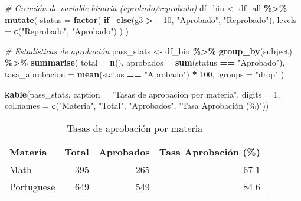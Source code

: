 \documentclass[
]{book}
\newenvironment{Shaded}{\begin{snugshade}}{\end{snugshade}}
\newcommand{\AttributeTok}[1]{\textcolor[rgb]{0.13,0.29,0.53}{#1}}
\newcommand{\CommentTok}[1]{\textcolor[rgb]{0.56,0.35,0.01}{\textit{#1}}}
\newcommand{\DecValTok}[1]{\textcolor[rgb]{0.00,0.00,0.81}{#1}}
\newcommand{\FunctionTok}[1]{\textcolor[rgb]{0.13,0.29,0.53}{\textbf{#1}}}
\newcommand{\NormalTok}[1]{#1}
\newcommand{\OtherTok}[1]{\textcolor[rgb]{0.56,0.35,0.01}{#1}}
\newcommand{\SpecialCharTok}[1]{\textcolor[rgb]{0.81,0.36,0.00}{\textbf{#1}}}
\newcommand{\StringTok}[1]{\textcolor[rgb]{0.31,0.60,0.02}{#1}}
\begin{document}
\begin{Shaded}
\begin{Highlighting}[]
\CommentTok{\# Creación de variable binaria (aprobado/reprobado)}
\NormalTok{df\_bin }\OtherTok{\textless{}{-}}\NormalTok{ df\_all }\SpecialCharTok{\%\textgreater{}\%}
  \FunctionTok{mutate}\NormalTok{(}
    \AttributeTok{status =} \FunctionTok{factor}\NormalTok{(}
      \FunctionTok{if\_else}\NormalTok{(g3 }\SpecialCharTok{\textgreater{}=} \DecValTok{10}\NormalTok{, }\StringTok{"Aprobado"}\NormalTok{, }\StringTok{"Reprobado"}\NormalTok{),}
      \AttributeTok{levels =} \FunctionTok{c}\NormalTok{(}\StringTok{"Reprobado"}\NormalTok{, }\StringTok{"Aprobado"}\NormalTok{)}
\NormalTok{    )}
\NormalTok{  )}

\CommentTok{\# Estadísticas de aprobación}
\NormalTok{pass\_stats }\OtherTok{\textless{}{-}}\NormalTok{ df\_bin }\SpecialCharTok{\%\textgreater{}\%}
  \FunctionTok{group\_by}\NormalTok{(subject) }\SpecialCharTok{\%\textgreater{}\%}
  \FunctionTok{summarise}\NormalTok{(}
    \AttributeTok{total =} \FunctionTok{n}\NormalTok{(),}
    \AttributeTok{aprobados =} \FunctionTok{sum}\NormalTok{(status }\SpecialCharTok{==} \StringTok{"Aprobado"}\NormalTok{),}
    \AttributeTok{tasa\_aprobacion =} \FunctionTok{mean}\NormalTok{(status }\SpecialCharTok{==} \StringTok{"Aprobado"}\NormalTok{) }\SpecialCharTok{*} \DecValTok{100}\NormalTok{,}
    \AttributeTok{.groups =} \StringTok{"drop"}
\NormalTok{  )}

\FunctionTok{kable}\NormalTok{(pass\_stats,}
      \AttributeTok{caption =} \StringTok{"Tasas de aprobación por materia"}\NormalTok{,}
      \AttributeTok{digits =} \DecValTok{1}\NormalTok{,}
      \AttributeTok{col.names =} \FunctionTok{c}\NormalTok{(}\StringTok{"Materia"}\NormalTok{, }\StringTok{"Total"}\NormalTok{, }\StringTok{"Aprobados"}\NormalTok{, }\StringTok{"Tasa Aprobación (\%)"}\NormalTok{))}
\end{Highlighting}
\end{Shaded}

\begin{table}

\caption{\label{tab:binary-analysis}Tasas de aprobación por materia}
\centering
\begin{tabular}[t]{l|r|r|r}
\hline
Materia & Total & Aprobados & Tasa Aprobación (\%)\\
\hline
Math & 395 & 265 & 67.1\\
\hline
Portuguese & 649 & 549 & 84.6\\
\hline
\end{tabular}
\end{table}
\end{document}
